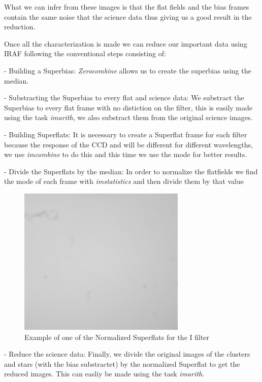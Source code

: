 What we can infer from these images is that the flat fields and the bias frames contain the same noise that the science data thus giving us a good result in the reduction.

Once all the characterization is made we can reduce our important data using IRAF following the conventional steps consisting of: 

- Building a Superbias: \textit{Zerocombine} allows us to create the superbias using the median.

- Substracting the Superbias to every flat and science data: We substract the Superbias to every flat frame with no distiction on the filter, this is easily made using the task \textit{imarith}, we also substract them from the original science images.

- Building Superflats: It is necessary to create a Superflat frame for each filter because the response of the CCD and will be different for different wavelengths, we use \textit{imcombine} to do this and this time we use the mode for better results.   

- Divide the Superflats by the median: In order to normalize the flatfields we find the mode of each frame with \textit{imstatistics} and then divide them by that value


\begin{figure}[H]
\centering
\includegraphics[width=8cm]{images/flat_I.png}
\caption[Normalized Superflat for the filter I]{Example of one of the Normalized Superflats for the I filter}
\end{figure}

- Reduce the science data: Finally, we divide the original images of the clusters and stars (with the bias substractet) by the normalized Superflat to get the reduced images. This can easliy be made using the task \textit{imarith}.

